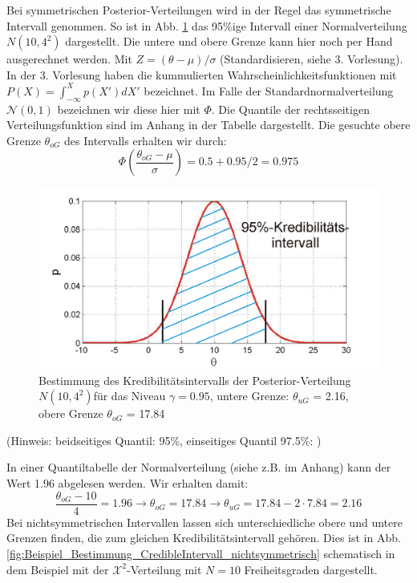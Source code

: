 Bei symmetrischen Posterior-Verteilungen wird in der Regel 
das symmetrische Intervall genommen. So ist in Abb. \ref{fig:Beispiel_Bestimmung_CredibleIntervall}  das 95\%ige Intervall 
einer Normalverteilung $N(10,4^2)$ dargestellt. 
Die untere und obere Grenze kann hier noch per Hand ausgerechnet werden. 
Mit $Z=(\theta - \mu)/ \sigma$ (Standardisieren, siehe 3. Vorlesung).
In der 3. Vorlesung haben die kummulierten Wahrscheinlichkeitsfunktionen mit $P(X) = \int_{-\infty}^{X} p(X') dX'$ bezeichnet. Im Falle der 
Standardnormalverteilung $\mathcal{N}(0,1)$ bezeichnen wir diese hier mit $\Phi$. Die Quantile der rechtsseitigen Verteilungsfunktion sind im Anhang in der Tabelle dargestellt. Die gesuchte obere Grenze $\theta_{oG}$ des Intervalls erhalten wir durch:
\[
\Phi\left(\frac{\theta_{oG}-\mu}{\sigma}\right) = 0.5 + 0.95/2 = 0.975   
\]
\begin{figure}[!htb]
	\begin{center}
		\includegraphics[width=120mm]
		{08_vorlesung/media/Posterior_Vertrauensintervall_all.png}
		\caption{Bestimmung des Kredibilitätsintervalls der Posterior-Verteilung $N(10,4^2)$für das Niveau
			$\gamma = 0.95 $, untere Grenze: $\theta_{uG}$ = 2.16, 
	    	obere Grenze $\theta_{oG}$ = 17.84}
    	\label{fig:Beispiel_Bestimmung_CredibleIntervall} 
	\end{center}
\end{figure}
(Hinweis: beidseitiges Quantil: 95\%, einseitiges Quantil 97.5\%: )

In einer Quantiltabelle der Normalverteilung (siehe z.B. im Anhang) kann der Wert 1.96 abgelesen werden.
Wir erhalten damit: 
\[
\frac{\theta_{oG}-10}{4} = 1.96 \rightarrow \theta_{oG} = 17.84 
\rightarrow \theta_{uG} = 17.84 - 2 \cdot 7.84 = 2.16
\]
Bei nichtsymmetrischen Intervallen lassen sich unterschiedliche obere und untere Grenzen finden, die zum gleichen Kredibilitätsintervall gehören. Dies ist in 
Abb. \ref{fig:Beispiel_Bestimmung_CredibleIntervall_nichtsymmetrisch}
schematisch in dem Beispiel mit der $\mathcal{X}^2$-Verteilung mit $N=10$ Freiheitsgraden dargestellt.

